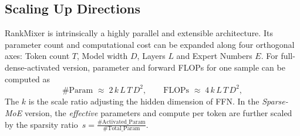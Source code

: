 


 \subsection{Scaling Up Directions}
 RankMixer is intrinsically a highly parallel and extensible
architecture.  Its parameter count and computational cost can be
expanded along four orthogonal axes: Token count \textbf{\(T\)}, Model width \textbf{\(D\)}, Layers \textbf{\(L\)} and Expert Numbers \textbf{\(E\)}. 
For full-dense-activated version, parameter and forward FLOPs for one sample can be computed as
\begin{equation}
  \text{\#Param}_{}
  \;\approx\;
  2\,k\,L\,T\,D^{2},
  \qquad
  \text{FLOPs}_{}
  \;\approx\;
  4\,k\,L\,T\,D^{2},
  \label{eq:dense_cost}
\end{equation}
The $k$ is the scale ratio adjusting the hidden dimension of FFN.
In the \emph{Sparse-MoE} version, the \emph{effective} parameters and
compute per token are further scaled by the sparsity ratio~$s=\frac{\text{\#Activated\_Param}}{  \text{\#Total\_Param}}$.



